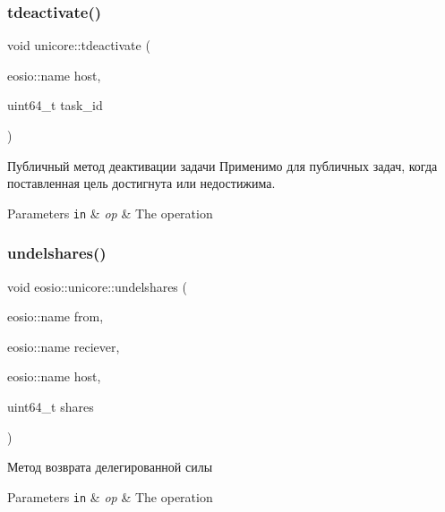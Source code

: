 \subsubsection{\texorpdfstring{tdeactivate()}{tdeactivate()}}
{\footnotesize\ttfamily void unicore\+::tdeactivate (\begin{DoxyParamCaption}\item[{eosio\+::name}]{host,  }\item[{uint64\+\_\+t}]{task\+\_\+id }\end{DoxyParamCaption})}



Публичный метод деактивации задачи Применимо для публичных задач, когда поставленная цель достигнута или недостижима. 


\begin{DoxyParams}[1]{Parameters}
\mbox{\tt in}  & {\em op} & The operation \\
\hline
\end{DoxyParams}
\mbox{\label{classeosio_1_1unicore_a20ec8fa3451334f2920a0b9b501dae6c}} 
\subsubsection{\texorpdfstring{undelshares()}{undelshares()}}
{\footnotesize\ttfamily void eosio\+::unicore\+::undelshares (\begin{DoxyParamCaption}\item[{eosio\+::name}]{from,  }\item[{eosio\+::name}]{reciever,  }\item[{eosio\+::name}]{host,  }\item[{uint64\+\_\+t}]{shares }\end{DoxyParamCaption})}



Метод возврата делегированной силы 


\begin{DoxyParams}[1]{Parameters}
\mbox{\tt in}  & {\em op} & The operation \\
\hline
\end{DoxyParams}
\mbox{\label{classeosio_1_1unicore_a4924fb028294b806d137c7d1934868f2}} 
